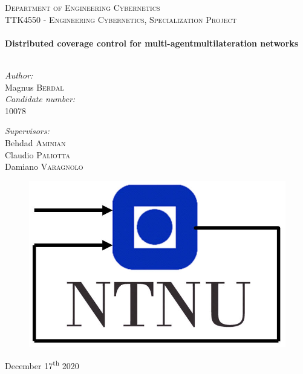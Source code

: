 \begin{titlepage}
    \vbox{}
    \vbox{}
    \noindent\textsc{\LARGE Department of Engineering Cybernetics}\\[0.5cm]
    \textsc{\large TTK4550 - Engineering Cybernetics, Specialization Project}\\[0.5cm]
    \vbox{ }
    \HRule \\[0.4cm]
    { \huge \bfseries Distributed coverage control for multi-agent\newline\newline multilateration networks}\\[0.15cm]
    \HRule \\[1.5cm]
    \begin{minipage}{0.4\textwidth}
    \begin{flushleft} \large
    \emph{Author:}\\
    Magnus \textsc{Berdal}\\
    \emph{Candidate number:}\\
    10078
    \end{flushleft}
    \end{minipage}
    \begin{minipage}{0.6\textwidth}
    \begin{flushright} \large
    \emph{Supervisors:} \\
    Behdad \textsc{Aminian}\\
    Claudio \textsc{Paliotta}\\
    Damiano \textsc{Varagnolo}\\
    \end{flushright}
    \end{minipage}
    \vfill
    \vfill
    \vfill
    \vfill
    \vfill
    \vfill
    \vfill
    \vfill
    \vfill
    \begin{figure}[h]
      \centering
      \includegraphics[width = .3\textwidth]{figs/itk_ntnu.jpg}
    \end{figure}
    \vfill
    December 17\textsuperscript{th} 2020
\end{titlepage}

\restoregeometry